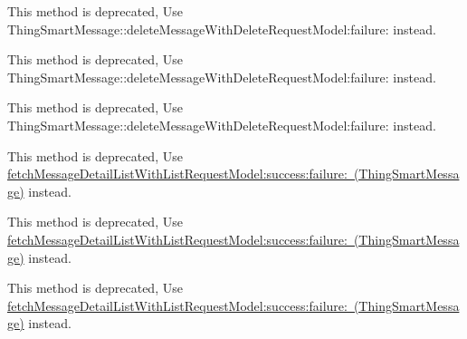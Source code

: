 \begin{DoxyRefList}
\label{deprecated__deprecated000191}%
%
This method is deprecated, Use Thing\+Smart\+Message\+::delete\+Message\+With\+Delete\+Request\+Model\+:failure\+: instead. 

\label{deprecated__deprecated000177}%
%
This method is deprecated, Use Thing\+Smart\+Message\+::delete\+Message\+With\+Delete\+Request\+Model\+:failure\+: instead. 

\label{deprecated__deprecated000198}%
%
This method is deprecated, Use Thing\+Smart\+Message\+::delete\+Message\+With\+Delete\+Request\+Model\+:failure\+: instead.  
\item[(Thing\+Deprecated\+Api) Member \mbox{\hyperlink{category_thing_smart_message_07_thing_deprecated_api_08_a63f107a2e407d2a7bd110b38b716129b}{\mbox{[}Thing\+Smart\+Message(Thing\+Deprecated\+Api) get\+Message\+Detail\+List\+With\+Type\+:msg\+Src\+Id\+:limit\+:offset\+:success\+:failure\+:\mbox{]}}} ]\label{deprecated__deprecated000186}%
%
This method is deprecated, Use \mbox{\hyperlink{interface_thing_smart_message_a2162807248d2106bef0a8c7906fc4413}{fetch\+Message\+Detail\+List\+With\+List\+Request\+Model\+:success\+:failure\+: (\+Thing\+Smart\+Message)}} instead. 

\label{deprecated__deprecated000179}%
%
This method is deprecated, Use \mbox{\hyperlink{interface_thing_smart_message_a2162807248d2106bef0a8c7906fc4413}{fetch\+Message\+Detail\+List\+With\+List\+Request\+Model\+:success\+:failure\+: (\+Thing\+Smart\+Message)}} instead. 

\label{deprecated__deprecated000172}%
%
This method is deprecated, Use \mbox{\hyperlink{interface_thing_smart_message_a2162807248d2106bef0a8c7906fc4413}{fetch\+Message\+Detail\+List\+With\+List\+Request\+Model\+:success\+:failure\+: (\+Thing\+Smart\+Message)}} instead. 


\end{DoxyRefList}
